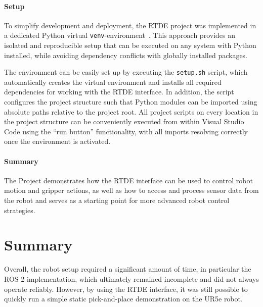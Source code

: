 \paragraph{Setup}
To simplify development and deployment, the RTDE project was implemented in a dedicated Python virtual \texttt{venv}-environment~\cite{VenvCreationVirtual}. This approach provides an isolated and reproducible setup that can be executed on any system with Python installed, while avoiding dependency conflicts with globally installed packages.

The environment can be easily set up by executing the \texttt{setup.sh} script, which automatically creates the virtual environment and installs all required dependencies for working with the RTDE interface. In addition, the script configures the project structure such that Python modules can be imported using absolute paths relative to the project root. All project scripts on every location in the project structure can be conveniently executed from within Visual Studio Code using the ``run button'' functionality, with all imports resolving correctly once the environment is activated.


\paragraph{Summary}
The Project demonstrates how the RTDE interface can be used to control robot motion and gripper actions, as well as how to access and process sensor data from the robot and serves as a starting point for more advanced robot control strategies. 




\section{Summary}
Overall, the robot setup required a significant amount of time, in particular the ROS 2 implementation, which ultimately remained incomplete and did not always operate reliably. However, by using the RTDE interface, it was still possible to quickly run a simple static pick-and-place demonstration on the UR5e robot.


